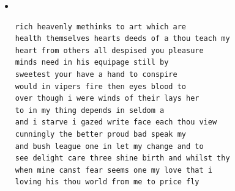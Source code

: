 \begin{itemize}
\item {} \\



\begin{lstlisting}
rich heavenly methinks to art which are
health themselves hearts deeds of a thou teach my
heart from others all despised you pleasure
minds need in his equipage still by
sweetest your have a hand to conspire
would in vipers fire then eyes blood to
over though i were winds of their lays her
to in my thing depends in seldom a
and i starve i gazed write face each thou view
cunningly the better proud bad speak my
and bush league one in let my change and to
see delight care three shine birth and whilst thy
when mine canst fear seems one my love that i
loving his thou world from me to price fly
\end{lstlisting}

\end{itemize}



